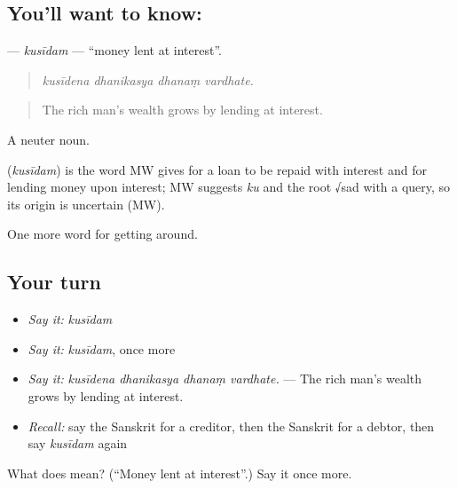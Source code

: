 \subsection*{You'll want to know: }
\textbf{} — \emph{kusīdam} — \textquotedblleft{}money lent at interest\textquotedblright{}.

\begin{quote}
   
\end{quote}

\begin{quote}
\emph{kusīdena dhanikasya dhanaṃ vardhate.}
\end{quote}

\begin{quote}
The rich man's wealth grows by lending at interest.
\end{quote}

A neuter noun.

\begin{cousinweb}
\textbf{} (\emph{kusīdam}) is the word MW gives for a loan to be repaid with interest and for lending money upon interest; MW suggests \emph{ku} and the root √sad with a query, so its origin is uncertain (MW).
\end{cousinweb}

\begin{grammarlens}[title={What you've built}]
One more word for getting around.
\end{grammarlens}

\subsection*{Your turn}
\begin{itemize}
\raggedright
  \item \emph{Say it:} \emph{kusīdam}
  \item \emph{Say it:} \emph{kusīdam}, once more
  \item \emph{Say it:} \emph{kusīdena dhanikasya dhanaṃ vardhate.} — The rich man's wealth grows by lending at interest.
  \item \emph{Recall:} say the Sanskrit for a creditor, then the Sanskrit for a debtor, then say \emph{kusīdam} again
\end{itemize}

\begin{tcolorbox}[breakable,colback=teal!4,colframe=teal!35!black,title={Before you move on}]
What does  mean? (\textquotedblleft{}Money lent at interest\textquotedblright{}.) Say it once more.
\end{tcolorbox}
